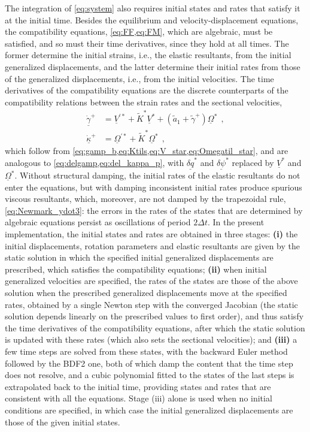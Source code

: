 \documentclass[12pt,a4paper,oneside,english]{abntex2} %
\newcommand{\fix}[1]{{\color{red}#1}}
\newcommand{\vect}[1]{\underline{#1}}
\def\til#1{\widetilde{#1}}
\def\lp{\left(}
\def\rp{\right)}
\def\aonetil{\til{a}_1}
\def\gam{\vect{\gamma}}
\def\gamptil{\til{\gamma}^{+}}
\def\gampdot{\dot{\gam}^{+}}
\def\kap{\vect{\kappa}}
\def\kappdot{\dot{\kap}^{+}}
\def\Ktil{\til{K}}
\def\Ktils{\Ktil^{*}}
\def\V{\vect{V}}
\def\Vs{\V^{*}}
\def\Om{\vect{\Omega}}
\def\Oms{\Om^{*}}
\def\delq{\vect{\delta q}}
\def\delqs{\delq^*}
\def\delpsi{\vect{\delta\psi}}
\def\delpsis{\delpsi^*}
\def\dt{\Delta t}
\def\dt{\Delta t}
\begin{document}
\fix{The integration of \cref{eq:system} also requires initial states and rates that satisfy it at the initial time. Besides the equilibrium and velocity-displacement equations, the compatibility equations, \cref{eq:FF,eq:FM}, which are algebraic, must be satisfied, and so must their time derivatives, since they hold at all times. The former determine the initial strains, i.e., the elastic resultants, from the initial generalized displacements, and the latter determine their initial rates from those of the generalized displacements, i.e., from the initial velocities. The time derivatives of the compatibility equations are the discrete counterparts of the compatibility relations between the strain rates and the sectional velocities,
\begin{equation}
    \begin{aligned}
        \gampdot &= \V^{\prime*} + \Ktils\Vs + \lp\aonetil+\gamptil\rp\Oms \ \ ,
        \\
        \kappdot &= \Om^{\prime*} + \Ktils\Oms \ \ ,
    \end{aligned}
    \label{eq:strain_rates}
\end{equation}
which follow from \cref{eq:gamp_b,eq:Ktils,eq:V_star,eq:Omegatil_star}, and are analogous to \cref{eq:delgamp,eq:del_kappa_p}, with $\delqs$ and $\delpsis$ replaced by $\Vs$ and $\Oms$. Without structural damping, the initial rates of the elastic resultants do not enter the equations, but with damping inconsistent initial rates produce spurious viscous resultants, which, moreover, are not damped by the trapezoidal rule, \cref{eq:Newmark_ydot3}: the errors in the rates of the states that are determined by algebraic equations persist as oscillations of period $2\dt$. In the present implementation, the initial states and rates are obtained in three stages: \textbf{(i)} the initial displacements, rotation parameters and elastic resultants are given by the static solution in which the specified initial generalized displacements are prescribed, which satisfies the compatibility equations; \textbf{(ii)} when initial generalized velocities are specified, the rates of the states are those of the above solution when the prescribed generalized displacements move at the specified rates, obtained by a single Newton step with the converged Jacobian (the static solution depends linearly on the prescribed values to first order), and thus satisfy the time derivatives of the compatibility equations, after which the static solution is updated with these rates (which also sets the sectional velocities); and \textbf{(iii)} a few time steps are solved from these states, with the backward Euler method followed by the BDF2 one, both of which damp the content that the time step does not resolve, and a cubic polynomial fitted to the states of the last steps is extrapolated back to the initial time, providing states and rates that are consistent with all the equations. Stage (iii) alone is used when no initial conditions are specified, in which case the initial generalized displacements are those of the given initial states.}
\end{document}
